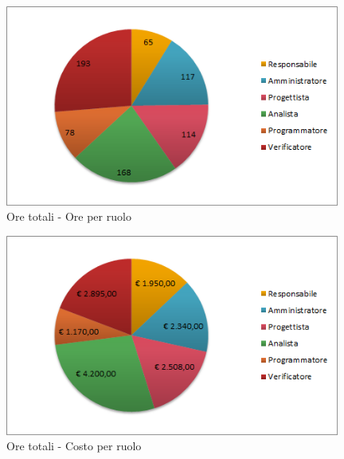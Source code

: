 \documentclass[./PianoDiProgetto.tex]{subfiles}
\begin{document}
	\begin{figure}[H]
		\centering
		\includegraphics[width=11cm, trim=1cm 0cm 1cm 0cm]{grafici/TOT-ruolo}
			\caption{Ore totali - Ore per ruolo}
	\end{figure}	
	
\newpage	
	
\vfill
	\begin{figure}[H]
		\centering
		\includegraphics[width=11cm, trim=1cm 0cm 1cm 0cm]{grafici/TOT-costo}
			\caption{Ore totali - Costo per ruolo}
	\end{figure}
\vfill
\newpage		
\end{document}
